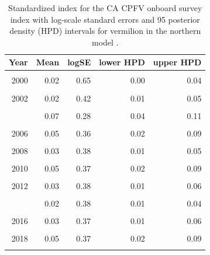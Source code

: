 \documentclass[11pt,
  english,
  a4paper,
]{article}
\begin{document}
\begin{table}

\caption{\label{tab:tab-index-cpfvonboard}Standardized index for the CA CPFV onboard survey index with log-scale standard errors and 95%
       posterior density (HPD) intervals for vermilion in the northern model .}
\centering
\begin{tabular}[t]{rrrrr}
\toprule
Year & Mean & logSE & lower HPD & upper HPD\\
\midrule
\cellcolor{gray!6}{1999} & \cellcolor{gray!6}{0.02} & \cellcolor{gray!6}{0.53} & \cellcolor{gray!6}{0.01} & \cellcolor{gray!6}{0.05}\\
2000 & 0.02 & 0.65 & 0.00 & 0.04\\
\cellcolor{gray!6}{2001} & \cellcolor{gray!6}{0.01} & \cellcolor{gray!6}{0.53} & \cellcolor{gray!6}{0.00} & \cellcolor{gray!6}{0.02}\\
2002 & 0.02 & 0.42 & 0.01 & 0.05\\
\cellcolor{gray!6}{2003} & \cellcolor{gray!6}{0.05} & \cellcolor{gray!6}{0.33} & \cellcolor{gray!6}{0.02} & \cellcolor{gray!6}{0.09}\\
\addlinespace
2004 & 0.07 & 0.28 & 0.04 & 0.11\\
\cellcolor{gray!6}{2005} & \cellcolor{gray!6}{0.04} & \cellcolor{gray!6}{0.38} & \cellcolor{gray!6}{0.02} & \cellcolor{gray!6}{0.08}\\
2006 & 0.05 & 0.36 & 0.02 & 0.09\\
\cellcolor{gray!6}{2007} & \cellcolor{gray!6}{0.06} & \cellcolor{gray!6}{0.35} & \cellcolor{gray!6}{0.03} & \cellcolor{gray!6}{0.11}\\
2008 & 0.03 & 0.38 & 0.01 & 0.05\\
\addlinespace
\cellcolor{gray!6}{2009} & \cellcolor{gray!6}{0.04} & \cellcolor{gray!6}{0.37} & \cellcolor{gray!6}{0.02} & \cellcolor{gray!6}{0.07}\\
2010 & 0.05 & 0.37 & 0.02 & 0.09\\
\cellcolor{gray!6}{2011} & \cellcolor{gray!6}{0.04} & \cellcolor{gray!6}{0.37} & \cellcolor{gray!6}{0.02} & \cellcolor{gray!6}{0.08}\\
2012 & 0.03 & 0.38 & 0.01 & 0.06\\
\cellcolor{gray!6}{2013} & \cellcolor{gray!6}{0.02} & \cellcolor{gray!6}{0.42} & \cellcolor{gray!6}{0.01} & \cellcolor{gray!6}{0.04}\\
\addlinespace
2014 & 0.02 & 0.38 & 0.01 & 0.04\\
\cellcolor{gray!6}{2015} & \cellcolor{gray!6}{0.04} & \cellcolor{gray!6}{0.37} & \cellcolor{gray!6}{0.02} & \cellcolor{gray!6}{0.07}\\
2016 & 0.03 & 0.37 & 0.01 & 0.06\\
\cellcolor{gray!6}{2017} & \cellcolor{gray!6}{0.04} & \cellcolor{gray!6}{0.36} & \cellcolor{gray!6}{0.02} & \cellcolor{gray!6}{0.08}\\
2018 & 0.05 & 0.37 & 0.02 & 0.09\\
\addlinespace
\cellcolor{gray!6}{2019} & \cellcolor{gray!6}{0.04} & \cellcolor{gray!6}{0.37} & \cellcolor{gray!6}{0.02} & \cellcolor{gray!6}{0.08}\\
\bottomrule
\end{tabular}
\end{table}
\end{document}
